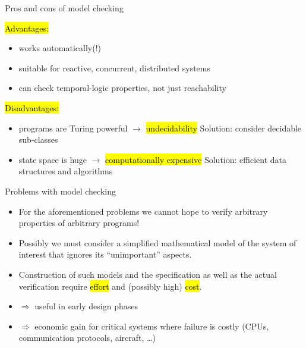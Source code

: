 
\begin{frame}{Pros and cons of model checking}

\hl{Advantages:}
\begin{itemize}
\item works automatically(!)
\item suitable for reactive, concurrent, distributed systems
\item can check temporal-logic properties, not just reachability
\end{itemize}

\bigskip
\hl{Disadvantages:}
\begin{itemize}
  \item programs are Turing powerful $\rightarrow$ \hl{undecidability}
    Solution: consider decidable sub-classes
  
  \item state space is huge $\rightarrow$ \hl{computationally expensive}
    Solution: efficient data structures and algorithms
\end{itemize}
\end{frame}


\begin{frame}{Problems with model checking}

  \begin{itemize}
    \item For the aforementioned problems we cannot hope to verify arbitrary
   properties of arbitrary programs!

    \item Possibly we must consider a simplified mathematical model of the system
   of interest that ignores its ``unimportant'' aspects.

    \item Construction of such models and the specification as well as the actual
   verification require \hl{effort} and (possibly high) \hl{cost}.

    \item $\Rightarrow$ useful in early design phases

    \item $\Rightarrow$ economic gain for critical systems where failure is
   costly (CPUs, communication protocols, aircraft, \ldots)
  \end{itemize}
\end{frame}


